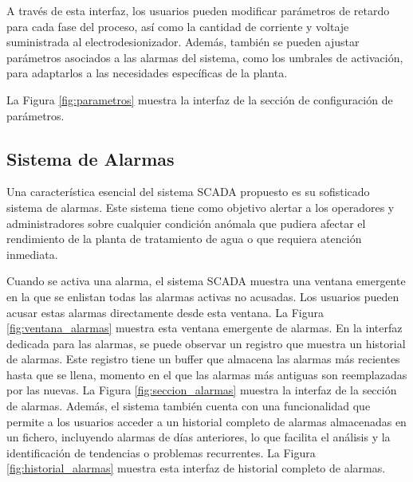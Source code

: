 A través de esta interfaz, los usuarios pueden modificar parámetros de retardo para cada fase del proceso, así como la cantidad de corriente y voltaje suministrada al electrodesionizador. Además, también se pueden ajustar parámetros asociados a las alarmas del sistema, como los umbrales de activación, para adaptarlos a las necesidades específicas de la planta.

La Figura \ref{fig:parametros} muestra la interfaz de la sección de configuración de parámetros.
\subsection{Sistema de Alarmas}

Una característica esencial del sistema SCADA propuesto es su sofisticado sistema de alarmas. Este sistema tiene como objetivo alertar a los operadores y administradores sobre cualquier condición anómala que pudiera afectar el rendimiento de la planta de tratamiento de agua o que requiera atención inmediata.

Cuando se activa una alarma, el sistema SCADA muestra una ventana emergente en la que se enlistan todas las alarmas activas no acusadas. Los usuarios pueden acusar estas alarmas directamente desde esta ventana. La Figura \ref{fig:ventana_alarmas} muestra esta ventana emergente de alarmas.
En la interfaz dedicada para las alarmas, se puede observar un registro que muestra un historial de alarmas. Este registro tiene un buffer que almacena las alarmas más recientes hasta que se llena, momento en el que las alarmas más antiguas son reemplazadas por las nuevas. La Figura \ref{fig:seccion_alarmas} muestra la interfaz de la sección de alarmas.
Además, el sistema también cuenta con una funcionalidad que permite a los usuarios acceder a un historial completo de alarmas almacenadas en un fichero, incluyendo alarmas de días anteriores, lo que facilita el análisis y la identificación de tendencias o problemas recurrentes. La Figura \ref{fig:historial_alarmas} muestra esta interfaz de historial completo de alarmas.



